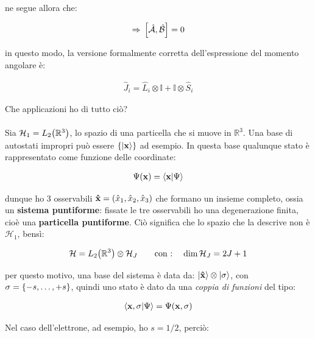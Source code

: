 \begin{enumerate}[label=\arabic*)]
		ne segue allora che:
		
	\begin{align*}
		\Rightarrow \, \qty[\hat{\mathcal{A}}, \hat{\mathcal{B}}] = 0
	\end{align*}
	
		in questo modo, la versione formalmente corretta dell'espressione del momento angolare è:
	
	\begin{mydef}
	\begin{align*}
		\hat{J}_i = \hat{L}_i \otimes \mathbb{I} + \mathbb{I} \otimes \hat{S}_i
	\end{align*}
	\end{mydef}

	
\end{enumerate}
	
	Che applicazioni ho di tutto ciò?
	\\
	\\
	Sia $\mathcal{H}_1 = L_2\qty(\mathbb{R}^3)$, lo spazio di una particella che si muove in $\mathbb{R}^3$. Una base di autostati impropri può essere $\qty{\ket{\vb{x}}}$ ad esempio. In questa base qualunque stato è rappresentato come funzione delle coordinate:
	
\begin{align*}
	\Psi\qty(\vb{x}) = \braket{\vb{x}}{\Psi}
\end{align*}

	dunque ho $3$ osservabili $\vb{\hat{x}} = \qty(\hat{x}_1, \hat{x}_2, \hat{x}_3) $ che formano un insieme completo, ossia un \textbf{sistema puntiforme}: fissate le tre osservabili ho una degenerazione finita, cioè una \textbf{particella puntiforme}. Ciò significa che lo spazio che la descrive non è $\mathcal{H}_1$, bensì:
	
\begin{align*}
	\mathcal{H} = L_2 \qty(\mathbb{R}^3) \otimes \mathcal{H}_J \qquad \text{con : }  \, \,\,\, \dim \mathcal{H}_J = 2 J + 1
\end{align*}

	per questo motivo, una base del sistema è data da: $\ket{\vb{\hat{x}}} \otimes \ket{\sigma}$, con $\sigma = \qty{-s, \ldots, + s}$, quindi uno stato è dato da una \textit{coppia di funzioni} del tipo:
	
\begin{align*}
	\braket{\vb{x}, \sigma }{\Psi} = \Psi\qty(\vb{x}, \sigma)
\end{align*}

 	Nel caso dell'elettrone, ad esempio, ho $s = 1/2$, perciò:
	
